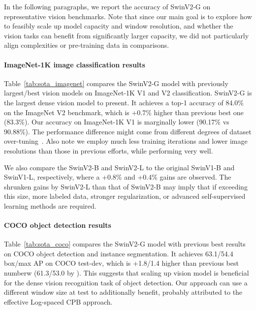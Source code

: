 \documentclass[10pt,twocolumn,letterpaper]{article}
\begin{document}
In the following paragraphs, we report the accuracy of SwinV2-G on representative vision benchmarks. Note that since our main goal is to explore how to feasibly scale up model capacity and window resolution, and whether the vision tasks can benefit from significantly larger capacity, we did not particularly align complexities or pre-training data in comparisons.

\paragraph{ImageNet-1K image classification results}

Table~\ref{tab:sota_imagenet} compares the SwinV2-G model with previously largest/best vision models on ImageNet-1K V1 and V2 classification. SwinV2-G is the largest dense vision model to present. It achieves a top-1 accuracy of 84.0\% on the ImageNet V2 benchmark, which is +0.7\% higher than previous best one (83.3\%). Our accuracy on ImageNet-1K V1 is marginally lower (90.17\% vs 90.88\%). The performance difference might come from different degrees of dataset over-tuning~\cite{recht2019imagenet}. Also note we employ much less training iterations and lower image resolutions than those in previous efforts, while performing very well.

We also compare the SwinV2-B and SwinV2-L to the original SwinV1-B and SwinV1-L, respectively, where a +0.8\% and +0.4\% gains are observed. The shrunken gains by SwinV2-L than that of SwinV2-B may imply that if exceeding this size, more labeled data, stronger regularization, or advanced self-supervised learning methods are required.

\vspace{-0.5em}
\paragraph{COCO object detection results}

Table~\ref{tab:sota_coco} compares the SwinV2-G model with previous best results on COCO object detection and instance segmentation. It achieves 63.1/54.4 box/max AP on COCO test-dev, which is +1.8/1.4 higher than previous best numberw (61.3/53.0 by \cite{xu2021endtoend}). This suggests that scaling up vision model is beneficial for the dense vision recognition task of object detection. Our approach can use a different window size at test to additionally benefit, probably attributed to the effective Log-spaced CPB approach.

\vspace{-0.5em}
\end{document}
